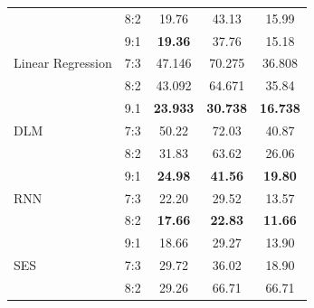 \documentclass[conference]{IEEEtran}
\begin{document}
\begin{table}[ht]
\begin{tabular}{|l|l|c|c|c|}
                               & 8:2                         & 19.76                     & 43.13                          & 15.99                    \\ \cline{2-5}
                               & 9:1                         & \textbf{19.36}            & 37.76                          & 15.18                    \\ \hline
        Linear Regression      & 7:3                         & 47.146                    & 70.275                         & 36.808                   \\ \cline{2-5}
                               & 8:2                         & 43.092                    & 64.671                         & 35.84                    \\ \cline{2-5}
                               & 9.1                         & \textbf{23.933}           & \textbf{30.738}                & \textbf{16.738}          \\ \hline
        DLM                    & 7:3                         & 50.22                     & 72.03                          & 40.87                    \\ \cline{2-5}
                               & 8:2                         & 31.83                     & 63.62                          & 26.06                    \\ \cline{2-5}
                               & 9:1                         & \textbf{24.98}            & \textbf{41.56}                 & \textbf{19.80}           \\ \hline
        RNN                    & 7:3                         & 22.20                     & 29.52                          & 13.57                    \\ \cline{2-5}
                               & 8:2                         & \textbf{17.66}            & \textbf{22.83}                 & \textbf{11.66}           \\ \cline{2-5}
                               & 9:1                         & 18.66                     & 29.27                          & 13.90                    \\ \hline
        SES                    & 7:3                         & 29.72                     & 36.02                          & 18.90                    \\ \cline{2-5}
                               & 8:2                         & 29.26                     & 66.71                          & 66.71                    \\ \cline{2-5}

\end{tabular}
\end{table}
\end{document}
